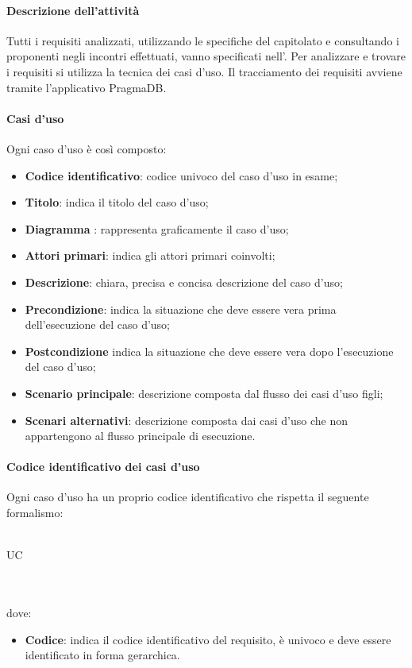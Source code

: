  \paragraph{Descrizione dell'attività}
 Tutti i requisiti analizzati, utilizzando le specifiche del capitolato e consultando i proponenti negli
incontri effettuati, vanno specificati nell'\ARdoc. Per analizzare e trovare i
requisiti si utilizza la tecnica dei casi d'uso. Il tracciamento dei requisiti avviene tramite l'applicativo PragmaDB.

 \paragraph{Casi d'uso}
 Ogni caso d'uso è così composto:
 \begin{itemize}
  \item \textbf{Codice identificativo}: codice univoco del caso d'uso in esame;
  \item \textbf{Titolo}: indica il titolo del caso d'uso;
  \item \textbf{Diagramma }: rappresenta graficamente il caso d'uso;
  \item \textbf{Attori primari}: indica gli attori primari coinvolti;
  \item \textbf{Descrizione}: chiara, precisa e concisa descrizione del caso d'uso;
  \item \textbf{Precondizione}: indica la situazione che deve essere vera prima dell'esecuzione del caso d'uso;
  \item \textbf{Postcondizione} indica la situazione che deve essere vera dopo l'esecuzione del caso d'uso;
  \item \textbf{Scenario principale}: descrizione composta dal flusso dei casi d'uso figli;
  \item \textbf{Scenari alternativi}: descrizione composta dai casi d'uso che non appartengono al flusso
principale di esecuzione.
 \end{itemize}
 \paragraph{Codice identificativo dei casi d'uso}
Ogni caso d'uso ha un proprio codice identificativo  che rispetta il seguente formalismo:\\ \\
\centerline{UC\textbraceright{}}
\\ \\dove:
\begin{itemize}
	\item \textbf{Codice}: indica il codice identificativo del requisito, è univoco e deve essere identificato in forma gerarchica.
\end{itemize}
